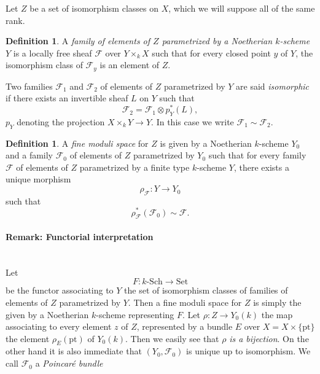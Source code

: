 \documentclass[12pt,a4paper]{book}
\def\FF{\mathscr{F}}
\def\kSch{k\text{-}\mathrm{Sch}}
\def\Set{\mathrm{Set}}
\def\pt{\mathrm{pt}}
\theoremstyle{definition} \newtheorem{defn}[thm]{Definition}
\theoremstyle{definition} \newtheorem{ejs}[thm]{Examples}
\theoremstyle{definition} \newtheorem{ej}[thm]{Example}
\begin{document}
      Let $Z$ be a set of isomorphism classes on $X$, which we will suppose all of the same rank.

      \begin{defn}\label{1.12}
	A \emph{family of elements of $Z$ parametrized by a Noetherian $k$-scheme $Y$} is a locally free sheaf $\FF$ over $Y\times_k X$ such that for every closed point $y$ of $Y$, the isomorphism class of $\FF_y$ is an element of $Z$.

	Two families $\FF_1$ and $\FF_2$ of elements of $Z$ parametrized by $Y$ are said \emph{isomorphic} if there exists an invertible sheaf $L$ on $Y$ such that
	\begin{equation*}
	  \FF_2 = \FF_1 \otimes p_Y^*(L),
	\end{equation*}
       $p_Y$ denoting the projection $X\times_k Y \rightarrow Y$. In this case we write $\FF_1 \sim \FF_2$.
      \end{defn}

      \begin{defn}\label{1.13}
	A \emph{fine moduli space} for $Z$ is given by a Noetherian $k$-scheme $Y_0$ and a family $\FF_0$ of elements of $Z$ parametrized by $Y_0$ such that for every family $\FF$ of elements of $Z$ parametrized by a finite type $k$-scheme $Y$, there exists a unique morphism
	\begin{equation*}
	  \rho_\FF: Y \rightarrow Y_0
	\end{equation*}
	such that
	\begin{equation*}
	  \rho_\FF^*(\FF_0) \sim \FF.
	\end{equation*}
      \end{defn}

  \paragraph{Remark: Functorial interpretation} \ \\
  Let
  \begin{equation*}
    F: \kSch \longrightarrow \Set
  \end{equation*}
  be the functor associating to $Y$ the set of isomorphism classes of families of elements of $Z$ parametrized by $Y$. Then a fine moduli space for $Z$ is simply the given by a Noetherian $k$-scheme representing $F$.
  Let $\rho:Z\rightarrow Y_0(k)$ the map associating to every element $z$ of $Z$, represented by a bundle $E$ over $X=X\times \{\pt\}$ the element $\rho_E(\pt)$ of $Y_0(k)$. Then we easily see that $\rho$ \emph{is a bijection}.
  On the other hand it is also immediate that $(Y_0,\FF_0)$ is unique up to isomorphism. We call $\FF_0$ a \emph{Poincaré bundle}
\end{document}
